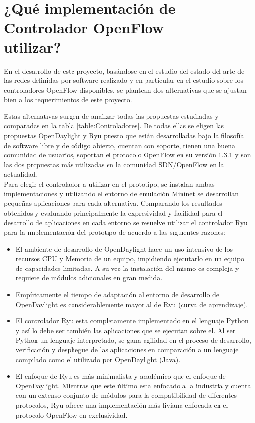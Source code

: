 \section[¿Qu\'e implementaci\'on de Controlador OpenFlow utilizar?]{¿Qu\'e implementaci\'on de Controlador OpenFlow \\ utilizar?}
En el desarrollo de este proyecto, basándose en el estudio del estado del arte de las redes definidas por software realizado y en particular en el estudio sobre los controladores OpenFlow disponibles, se plantean dos alternativas que se ajustan bien a los requerimientos de este proyecto.

Estas alternativas surgen de analizar todas las propuestas estudiadas y comparadas en la tabla \ref{table:Controladores}. De todas ellas se eligen las propuestas OpenDaylight y Ryu puesto que est\'an desarrolladas bajo la filosofía de software libre y de código abierto, cuentan con soporte, tienen una buena comunidad de usuarios, soportan el protocolo OpenFlow en su versi\'on 1.3.1 y son las dos propuestas m\'as utilizadas en la comunidad SDN/OpenFlow en la actualidad.\\

Para elegir el controlador a utilizar en el prototipo, se instalan ambas implementaciones y utilizando el entorno de emulación Mininet se desarrollan pequeñas aplicaciones para cada alternativa. Comparando los resultados obtenidos y evaluando principalmente la expresividad y facilidad para el desarrollo de aplicaciones en cada entorno se resuelve utilizar el controlador Ryu para la implementaci\'on del prototipo de acuerdo a las siguientes razones:

\begin{itemize}
\item El ambiente de desarrollo de OpenDaylight hace un uso intensivo de los recursos CPU y Memoria de un equipo, impidiendo ejecutarlo en un equipo de capacidades limitadas. A su vez la instalaci\'on del mismo es compleja y requiere de m\'odulos adicionales en gran medida.

\item Empíricamente el tiempo de adaptaci\'on al entorno de desarrollo de OpenDaylight es considerablemente mayor al de Ryu (curva de aprendizaje).  

\item El controlador Ryu esta completamente implementado en el lenguaje Python y as\'i lo debe ser también las aplicaciones que se ejecutan sobre el. Al ser Python un lenguaje interpretado, se gana agilidad en el proceso de desarrollo, verificaci\'on y despliegue de las aplicaciones en comparaci\'on a un lenguaje compilado como el utilizado por OpenDaylight (Java).

\item El enfoque de Ryu es m\'as minimalista y académico que el enfoque de OpenDaylight. Mientras que este \'ultimo esta enfocado a la industria y cuenta con un extenso conjunto de módulos para la compatibilidad de diferentes protocolos, Ryu ofrece una implementaci\'on m\'as liviana enfocada en el protocolo OpenFlow en exclusividad. 
\end{itemize}  
